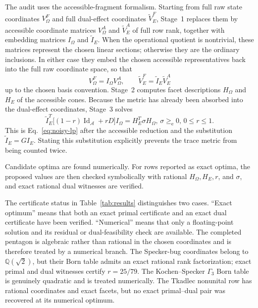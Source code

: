 \documentclass[aps,pra,twocolumn,superscriptaddress,nofootinbib]{revtex4-2}
\begin{document}
The audit uses the accessible-fragment formalism.  Starting from full raw
state coordinates $V^F_\Omega$ and full dual-effect coordinates
$\widetilde V^F_E$, Stage~1 replaces them by accessible coordinate matrices
$V^A_\Omega$ and $\widetilde V^A_E$ of full row rank, together with embedding
matrices $I_\Omega$ and $\widetilde I_E$.  When the operational
quotient is nontrivial, these matrices represent the chosen linear sections;
otherwise they are the ordinary inclusions.  In either case they embed the
chosen accessible representatives back into the full raw coordinate space, so
that
\begin{equation}
        V^F_\Omega=I_\Omega V^A_\Omega,
        \qquad
        \widetilde V^F_E=\widetilde I_E\widetilde V^A_E
\end{equation}
up to the chosen basis convention.
Stage~2 computes facet descriptions
$H_\Omega$ and $H_E$ of the accessible cones.
Because the metric has already been absorbed into the dual-effect coordinates,
Stage~3 solves
\begin{equation}
        \widetilde I_E^T\bigl[(1-r)\operatorname{Id}_{\mathcal A}+rD\bigr]I_\Omega
        =
        H_E^T\sigma H_\Omega,
        \,
        \sigma\ge_{\mathrm e}0,
        \,
        0\le r\le1.
        \label{eq:stage3-audit}
\end{equation}
This is Eq.~\eqref{eq:noisy-lp} after the accessible reduction and the
substitution $\widetilde I_E=GI_E$.  Stating this substitution explicitly
prevents the trace metric from being counted twice.

Candidate optima are found numerically.  For rows reported as exact optima,
the proposed values are then checked symbolically with rational
$H_\Omega,H_E,r$, and $\sigma$, and exact rational dual witnesses are verified.

The certificate status in Table~\ref{tab:results} distinguishes two cases.
``Exact optimum'' means that both an exact primal certificate and an exact dual
certificate have been verified.  ``Numerical'' means that only a floating-point
solution and its residual or dual-feasibility check are available.  The
completed pentagon is algebraic rather than rational in the chosen coordinates
and is therefore treated by a numerical branch.  The Specker-bug coordinates
belong to $\mathbb Q(\sqrt2)$, but their Born table admits an exact rational
rank factorization; exact primal and dual witnesses certify $r=25/79$.
The Kochen--Specker $\Gamma_3$ Born table is genuinely quadratic and is treated
numerically.  The Tkadlec nonunital row has rational coordinates and exact
facets, but no exact primal--dual pair was recovered at its numerical optimum.
\end{document}
